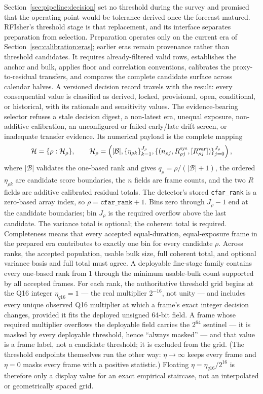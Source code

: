 Section~\ref{sec:pipeline:decision} set no threshold during the survey and promised that the operating point would be tolerance-derived once the forecast matured. RFIsher's threshold stage is that replacement, and its interface separates preparation from selection. Preparation operates only on the current era of Section~\ref{sec:calibration:eras}; earlier eras remain provenance rather than threshold candidates. It requires already-filtered valid rows, establishes the anchor and bulk, applies floor and correlation conventions, calibrates the proxy-to-residual transfers, and compares the complete candidate surface across calendar halves.  A versioned decision record travels with the result: every consequential value is classified as derived, locked, provisional, open, conditional, or historical, with its rationale and sensitivity values.  The evidence-bearing selector refuses a stale decision digest, a non-latest era, unequal exposure, non-additive calibration, an unconfigured or failed early/late drift screen, or inadequate transfer evidence. Its numerical payload is the complete mapping
\[
\mathcal H=\{\rho:\mathcal H_\rho\},\qquad
\mathcal H_\rho=\left(
|\mathcal B|,
\{\eta_{\rho k}\}_{k=1}^{J_\rho},
\{(n_{\rho j},R^{\rm sys}_{\rho j},[R^{\rm var}_{\rho j}])\}_{j=0}^{J_\rho}
\right),
\]
where $|\mathcal B|$ validates the one-based rank and gives $q_\rho=\rho/(|\mathcal B|+1)$, the ordered $\eta_{\rho k}$ are candidate score boundaries, the $n$ fields are frame counts, and the two $R$ fields are additive calibrated residual totals. The detector's stored \texttt{cfar\_rank} is a zero-based array index, so $\rho=\texttt{cfar\_rank}+1$. Bins zero through $J_\rho-1$ end at the candidate boundaries; bin $J_\rho$ is the required overflow above the last candidate. The variance total is optional; the coherent total is required. Completeness means that every accepted equal-duration, equal-exposure frame in the prepared era contributes to exactly one bin for every candidate $\rho$. Across ranks, the accepted population, usable bulk size, full coherent total, and optional variance basis and full total must agree.  A deployable fine-stage family contains every one-based rank from $1$ through the minimum usable-bulk count supported by all accepted frames. For each rank, the authoritative threshold grid begins at the Q16 integer $\eta_{q16}=1$ --- the real multiplier $2^{-16}$, not unity --- and includes every unique observed Q16 multiplier at which a frame's exact integer decision changes, provided it fits the deployed unsigned 64-bit field. A frame whose required multiplier overflows the deployable field carries the $2^{64}$ sentinel --- it is masked by every deployable threshold, hence ``always masked'' --- and that value is a frame label, not a candidate threshold; it is excluded from the grid. (The threshold endpoints themselves run the other way: $\eta \to \infty$ keeps every frame and $\eta = 0$ masks every frame with a positive statistic.) Floating $\eta=\eta_{q16}/2^{16}$ is therefore only a display value for an exact empirical staircase, not an interpolated or geometrically spaced grid.

